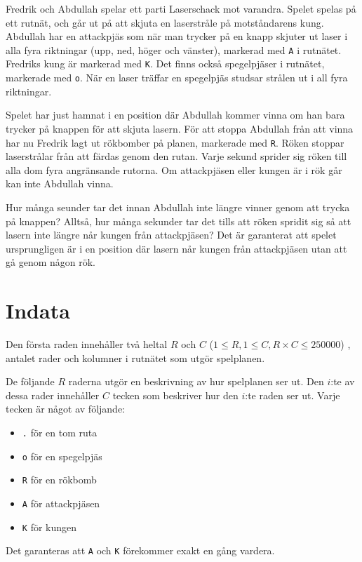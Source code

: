 Fredrik och Abdullah spelar ett parti Laserschack mot varandra. Spelet spelas på ett rutnät,
och går ut på att skjuta en laserstråle på motståndarens kung.
Abdullah har en attackpjäs som när man trycker på en knapp skjuter ut laser i alla fyra riktningar (upp, ned, höger och vänster), markerad med \texttt{A} i rutnätet.
Fredriks kung är markerad med \texttt{K}. Det finns också spegelpjäser i rutnätet, markerade med \texttt{o}.
När en laser träffar en spegelpjäs studsar strålen ut i all fyra riktningar.

Spelet har just hamnat i en position där Abdullah kommer vinna om han bara trycker på knappen för att skjuta lasern.
För att stoppa Abdullah från att vinna har nu Fredrik lagt ut rökbomber på planen, markerade med \texttt{R}.
Röken stoppar laserstrålar från att färdas genom den rutan. Varje sekund sprider sig röken till alla dom fyra angränsande rutorna.
Om attackpjäsen eller kungen är i rök går kan inte Abdullah vinna. 

Hur många seunder tar det innan Abdullah inte längre vinner genom att trycka på knappen?
Alltså, hur många sekunder tar det tills att röken spridit sig så att lasern inte längre når kungen från attackpjäsen?
Det är garanterat att spelet ursprungligen är i en position där lasern når kungen från attackpjäsen utan att gå genom någon rök.

\section*{Indata}
Den första raden innehåller två heltal $R$ och $C$ ($1\le R, 1 \le C, R\times C \le 250 000$) , antalet rader och kolumner i rutnätet som utgör spelplanen.

De följande $R$ raderna utgör en beskrivning av hur spelplanen ser ut.
Den $i$:te av dessa rader innehåller $C$ tecken som beskriver hur den $i$:te raden ser ut.
Varje tecken är något av följande:
\begin{itemize}
    \item \texttt{.} för en tom ruta
    \item \texttt{o} för en spegelpjäs
    \item \texttt{R} för en rökbomb
    \item \texttt{A} för attackpjäsen
    \item \texttt{K} för kungen
\end{itemize}
Det garanteras att \texttt{A} och \texttt{K} förekommer exakt en gång vardera.

